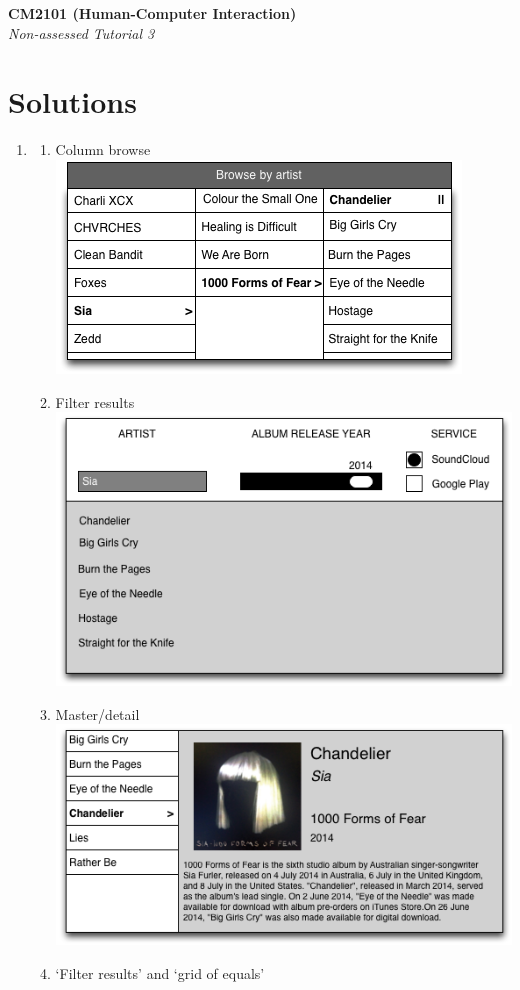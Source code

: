 \documentclass[11pt,a4paper]{report}
\begin{document}
\noindent\Large\textbf{CM2101 (Human-Computer Interaction)}\\
\noindent\large\textit{Non-assessed Tutorial 3}
\vskip30pt

\section*{Solutions}

\begin{enumerate}
    \item   
        \begin{enumerate}
            \item Column browse\\ \includegraphics[width=.6\textwidth]{media/column_browse.png}
            \item Filter results\\ \includegraphics[width=.6\textwidth]{media/filter_results.png}
            \item Master/detail\\ \includegraphics[width=.6\textwidth]{media/master_detail.png}
            \newpage
            \item `Filter results' and `grid of equals'\\ \vskip10pt

\end{enumerate}
\end{enumerate}
\end{document}
